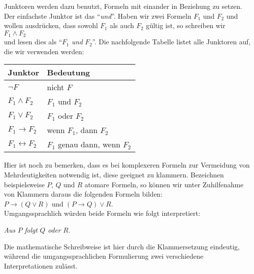 \begin{enumerate}
      Junktoren werden dazu benutzt, Formeln mit einander in Beziehung zu setzen.  Der einfachste Junktor
      ist das ``\emph{und}''. Haben wir zwei Formeln $F_1$ und $F_2$ und wollen ausdrücken, dass sowohl
      $F_1$ als auch $F_2$ gültig ist, so schreiben wir \\[0.2cm]
      \hspace*{1.3cm} $F_1 \wedge F_2$ \\[0.2cm]
      und lesen dies als ``$F_1$ \emph{und} $F_2$''.  Die nachfolgende Tabelle listet alle
      Junktoren auf, die wir verwenden werden: \\[0.2cm]
      \hspace*{1.3cm} 
      \begin{tabular}{|l|l|}
      \hline
      Junktor & Bedeutung \\
      \hline
      \hline
        $\neg F$ & nicht $F$ \\
      \hline
        $F_1 \wedge F_2$ & $F_1$ und $F_2$ \\
      \hline
        $F_1 \vee F_2$ & $F_1$ oder $F_2$ \\
      \hline
        $F_1 \rightarrow F_2$ & wenn $F_1$, dann $F_2$ \\
      \hline
        $F_1 \leftrightarrow F_2$ &  $F_1$ genau dann, wenn $F_2$ \\
      \hline
      \end{tabular}

      Hier ist noch zu bemerken, dass es bei komplexeren Formeln zur Vermeidung von Mehrdeutigkeiten
      notwendig ist, diese geeignet zu klammern.  Bezeichnen beispielsweise
      $P$, $Q$ und $R$ atomare Formeln,
      so können wir unter Zuhilfenahme von Klammern daraus  die folgenden Formeln bilden: \\[0.2cm]
      \hspace*{1.3cm}  $P \rightarrow (Q \vee R)$ \quad und \quad $(P \rightarrow Q) \vee R$. \\[0.2cm]
      Umgangssprachlich würden beide Formeln wie folgt interpretiert: 
      \begin{center}
      \begin{minipage}{12cm}
        \textsl{Aus $P$ folgt $Q$ oder $R$.}
      \end{minipage}
      \end{center}
      Die mathematische Schreibweise ist hier durch die Klammersetzung eindeutig, während
      die umgangssprachlichen Formulierung zwei verschiedene Interpretationen zulässt.


\end{enumerate}
